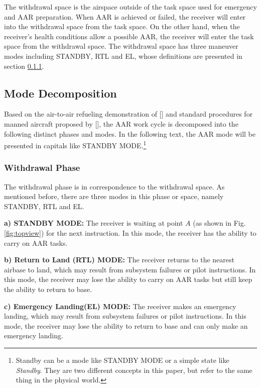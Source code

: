 The withdrawal space is the airspace outside of the task space used for emergency and AAR preparation. When AAR is achieved or failed, the receiver will enter into the withdrawal space from the task space. On the other hand, when the receiver's health conditions allow a possible AAR, the receiver will enter the task space from the withdrawal space. The withdrawal space has three maneuver modes including STANDBY, RTL and EL, whose definitions are presented in section \ref{sec:withdrawphase}.

\subsection{Mode Decomposition}
\label{sec:mode_decom}

Based on the air-to-air refueling demonstration of [] and standard  procedures for manned aircraft proposed by [], the AAR work cycle is decomposed into the following distinct phases and modes. In the following text, the AAR mode will be presented in capitals like STANDBY MODE.\footnote{Standby can be a mode like STANDBY MODE or a simple state like \textit{Standby}. They are two different concepts in this paper, but refer to the same thing in the physical world.}

\subsubsection{Withdrawal Phase}
\label{sec:withdrawphase}
The withdrawal phase is in correspondence to the withdrawal space. As mentioned before, there are three modes in this phase or space, namely STANDBY, RTL and EL. 

\vspace{1ex}
\hspace{-1.5em}\textbf{a) STANDBY MODE:} The receiver is waiting at point $ A $ (as shown in Fig. \ref{fig:topview}) for the next instruction. In this mode, the receiver has the ability to carry on AAR tasks.

\vspace{1ex}
\hspace{-1.5em}\textbf{b) Return to Land (RTL) MODE:} The receiver returns to the nearest airbase to land, which may result from subsystem failures or pilot instructions. In this mode, the receiver may lose the ability to carry on AAR tasks but still keep the ability to return to base.

\vspace{1ex}
\hspace{-1.5em}\textbf{c) Emergency Landing(EL) MODE:} The receiver makes an emergency landing, which may result from subsystem failures or pilot instructions. In this mode, the receiver may lose the ability to return to base and can only make an emergency landing.

